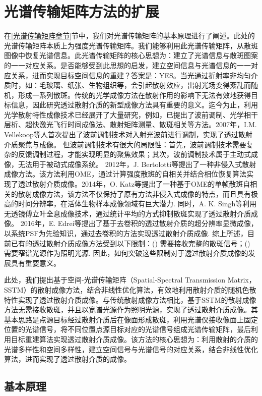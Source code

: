 \section{光谱传输矩阵方法的扩展}
在\ref{光谱传输矩阵章节}节中，我们对光谱传输矩阵的基本原理进行了阐述。此处的光谱传输矩阵本质上为强度光谱传输矩阵。我们能够利用此光谱传输矩阵，从散斑图像中恢复光谱信息。此光谱传输矩阵的核心思想为：建立了光谱信息与散斑图案的一一对应关系。是否能够受到此思想的启发，建立空间信息与光谱信息的一一对应关系，进而实现目标空间信息的重建？答案是：YES。当光通过折射率非均匀介质时，如：毛玻璃、纸张、生物组织等，会引起散射效应，出射光场变得紊乱而随机，形成一系列散斑。传统的光学成像方法在散射作用的影响下无法有效地获得目标信息，因此研究透过散射介质的新型成像方法具有重要的意义。迄今为止，利用光学散射特性成像技术已经展开了大量研究，例如，已提出了波前调制、光学相干层析、超快激光飞行时间成像法、散射矩阵测量、散斑相关等方法。2007年，I.M. Vellekoop等人首次提出了波前调制技术对入射光波前进行调制，实现了透过散射介质聚焦与成像。 但波前调制技术有很大的局限性：首先，波前调制技术需要复杂的反馈调制过程，才能实现明显的聚焦效果；其次，波前调制技术属于主动式成像，无法用于被动式成像系统。 2012年，J. Bertolotti等提出了一种非侵入式散射成像方法。该方法利用OME，通过计算强度散斑的自相关并结合相位恢复算法实现了透过散射介质成像。2014年，O. Katz等提出了一种基于OME的单帧散斑自相关的散射成像方法，该方法不仅保持了原有方法非侵入式成像的特点，而且具有极高的时间分辨率，在活体生物样本成像领域有巨大潜力. 同时，A. K. Singh等利用无透镜傅立叶全息成像技术，通过统计平均的方式抑制散斑实现了透过散射介质成像。 2016年，E. Edrei等提出了基于去卷积的透过散射介质的超分辨率显微成像，以系统PSF为先验知识，通过去卷积的方法实现透过散射介质成像. 综上所述，目前已有的透过散射介质成像方法受到以下限制：() 需要接收完整的散斑信号；() 需要窄谱光源作为照明光源. 因此，如何突破这些限制对于透过散射介质成像的发展具有重要意义。

此处，我们提出基于空间-光谱传输矩阵（Spatial-Spectral Transmission Matrix，SSTM）的散射成像方法，结合非线性优化算法，有效地利用散射介质的随机色散特性实现了透过散射介质成像。与传统散射成像方法相比，基于SSTM的散射成像方法无需接收散斑，并且以宽谱光源作为照明光源，实现了透过散射介质成像。其基本思路是点源目标经过散射介质后在像面形成散斑，利用光谱仪接收像面上固定位置的光谱信号，将不同位置点源目标对应的光谱信号组成光谱传输矩阵，最后利用目标重建算法实现透过散射介质成像。该方法的核心思想为：利用散射的介质的光谱多样性和空间多样性，建立空间信号与光谱信号的对应关系，结合非线性优化算法，进而实现了透过散射介质的成像。
\subsection{基本原理}

